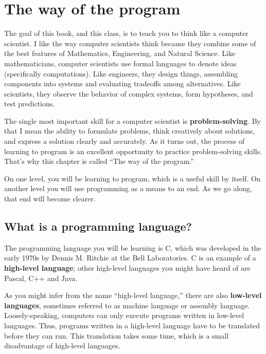 
\chapter{The way of the program}
\label{chap01}

The goal of this book, and this class, is to teach you to think like a
computer scientist.  I like the way computer scientists think because
they combine some of the best features of Mathematics, Engineering,
and Natural Science.  Like mathematicians, computer scientists use formal
languages to denote ideas (specifically computations).  Like
engineers, they design things, assembling components into systems and
evaluating tradeoffs among alternatives.  Like scientists,
they observe the behavior of complex systems, form hypotheses, and test
predictions.

The single most important skill for a computer scientist is {\bf
problem-solving}.  By that I mean the ability to formulate problems,
think creatively about solutions, and express a solution clearly and
accurately.  As it turns out, the process of learning to program is an
excellent opportunity to practice problem-solving skills.  That's why
this chapter is called ``The way of the program.''

On one level, you will be learning to program, which is a useful
skill by itself.  On another level you will use programming
as a means to an end.  As we go along, that end will
become clearer.

\section{What is a programming language?}

The programming language you will be learning is C, which was developed
in the early 1970s by Dennis M. Ritchie at the Bell Laboratories.  C is
an example of a {\bf high-level language}; other high-level languages
you might have heard of are Pascal, C++ and Java.

As you might infer from the name ``high-level language,'' there are
also {\bf low-level languages}, sometimes referred to as machine
language or assembly language.  Loosely-speaking, computers can only
execute programs written in low-level languages.  Thus, programs
written in a high-level language have to be translated before they can
run.  This translation takes some time, which is a small disadvantage
of high-level languages.

